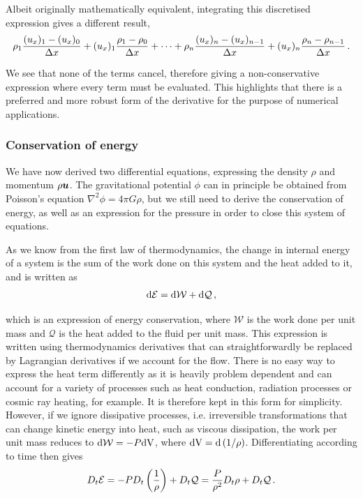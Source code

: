 Albeit originally mathematically equivalent, integrating this discretised expression gives a different result,
\begin{equation}
    \rho_1 \frac{(u_x)_1 - (u_x)_0}{\Delta x} + (u_x)_1 \frac{\rho_1 - \rho_0}{\Delta x} + \cdots + \rho_n \frac{(u_x)_n - (u_x)_{n-1}}{\Delta x} + (u_x)_n \frac{\rho_n - \rho_{n-1}}{\Delta x} \punct{.}
\end{equation}

We see that none of the terms cancel, therefore giving a non-conservative expression where every term must be evaluated. This highlights that there is a preferred and more robust form of the derivative for the purpose of numerical applications.

\subsubsection{Conservation of energy} \label{sec:fluid_eq_ener}

We have now derived two differential equations, expressing the density \(\rho\) and momentum \(\rho \fvec{u}\). The gravitational potential \(\phi\) can in principle be obtained from Poisson's equation \(\nabla^2 \phi = 4 \pi G \rho\), but we still need to derive the conservation of energy, as well as an expression for the pressure in order to close this system of equations.

As we know from the first law of thermodynamics, the change in internal energy of a system is the sum of the work done on this system and the heat added to it, and is written as
\begin{equation}
    \upd \mathcal{E} = \upd \mathcal{W} + \upd \mathcal{Q} \punct{,}
\end{equation}

which is an expression of energy conservation, where \(\mathcal{W}\) is the work done per unit mass and \(\mathcal{Q}\) is the heat added to the fluid per unit mass. This expression is written using thermodynamics derivatives that can straightforwardly be replaced by Lagrangian derivatives if we account for the flow. There is no easy way to express the heat term differently as it is heavily problem dependent and can account for a variety of processes such as heat conduction, radiation processes or cosmic ray heating, for example. It is therefore kept in this form for simplicity. However, if we ignore dissipative processes, i.e. irreversible transformations that can change kinetic energy into heat, such as viscous dissipation, the work per unit mass reduces to \(\upd \mathcal{W} = - P \upd[V]\), where \(\upd[V] = \upd \left( 1 / \rho \right)\). Differentiating according to time then gives
\begin{equation}
    D_t \mathcal{E} = -P D_t \left( \frac{1}{\rho} \right)  + D_t \mathcal{Q} = \frac{P}{\rho^2} D_t \rho + D_t \mathcal{Q} \punct{.}
\end{equation}

